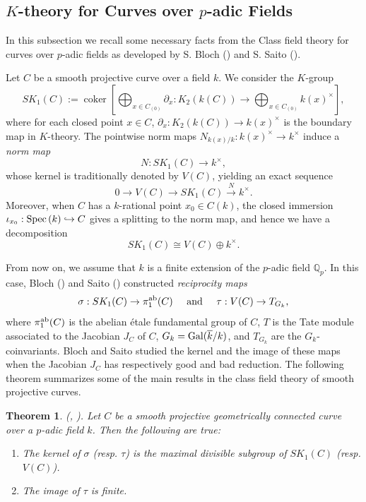 \documentclass[12pt]{amsart}
\newtheorem{theo}[theo]{Theorem}
\theoremstyle{remark}
\newcommand{\Q}{{\mathbb Q}}
\renewcommand{\1}{{\mathbb{S}}}
\newcommand{\Spec}{{\rm Spec \,}}
\newcommand{\ab}{\rm ab}
\newcommand{\Gal}{{\rm Gal}}
\newcommand{\<}{\langle}
\renewcommand{\>}{\rangle}
\newcommand{\cok}{{\operatorname{coker}}}
\begin{document}
	
\subsection{$K$-theory for Curves over $p$-adic Fields}\label{k-theory-curves}\label{sec:SK1}
In this subsection we recall some necessary facts from the Class field theory for curves over $p$-adic fields as developed by S. Bloch (\cite{Bl1}) and S. Saito (\cite{Sai}). 

Let $C$ be a smooth projective curve over a field $k$. We consider the $K$-group
\[SK_1(C):=\cok\left[\bigoplus_{x\in C_{(0)}}\partial_x:K_2(k(C))\to \bigoplus_{x\in C_{(0)}}k(x)^\times\right],\]    where for each closed point $x\in C$, $\partial_x: K_2(k(C))\to k(x)^\times$ is the boundary map in $K$-theory.  The pointwise norm maps $N_{k(x)/k}:k(x)^\times\to k^\times$
induce a \textit{norm map} 
\[N:SK_1(C)\to k^\times,\] 
whose kernel is traditionally denoted by $V(C)$,  %
yielding an exact sequence 
\[0\to V(C)\to SK_1(C)\xrightarrow{N} k^\times.\] 
Moreover, when $C$ has a $k$-rational point $x_0\in C(k)$, the closed immersion $\iota_{x_0}:\Spec(k)\hookrightarrow C$ gives a splitting to the norm map, and hence we have a decomposition 
\begin{equation}\label{eq0}
    SK_1(C)\cong V(C)\oplus k^\times.
\end{equation} 

From now on, we assume that $k$ is a finite extension of the $p$-adic field $\Q_p$.  In this case, Bloch (\cite{Bl1}) and Saito (\cite{Sai})  constructed \textit{reciprocity maps}  
\[\sigma: SK_1(C)\to\pi_1^{\ab}(C) \;\;\;\;\;\text{and}\;\;\;\;\;\tau: V(C)\to T_{G_k},\]
where $\pi_1^{\ab}(C)$ is the abelian \'{e}tale fundamental group of $C$, $T$ is the Tate module associated to the Jacobian $J_C$ of $C$, $G_k=\Gal(\overline{k}/k)$, and $T_{G_k}$ are the $G_k$-coinvariants.  Bloch and Saito studied the kernel and the image of these maps when the Jacobian $J_C$ has respectively good and bad reduction. The following theorem summarizes some of the main results in the class field theory of smooth projective curves. 
\begin{theo}\label{CFTcurves} (\cite[Theorem 2.9]{Bl1}, \cite[Chap. II, Theorems 5.1 \& 4.1]{Sai}). Let $C$ be a smooth projective geometrically connected curve over a $p$-adic field $k$. Then the following are true:
\begin{enumerate}
    \item[(i)] The kernel of $\sigma$ (resp. $\tau$) is the maximal divisible subgroup of $SK_1(C)$ (resp. $V(C)$). 
    \item[(ii)] The image of $\tau$ is finite. 
\end{enumerate}
\end{theo}
\end{document}

